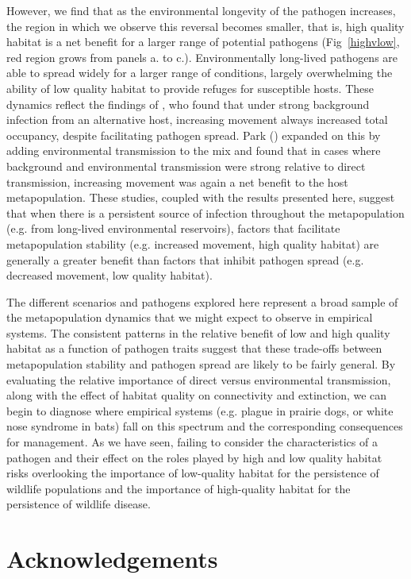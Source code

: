 \documentclass{article}
\begin{document}
However, we find that as the environmental longevity of the pathogen increases, the region in which we observe this reversal becomes smaller, that is, high quality habitat is a net benefit for a larger range of potential pathogens (Fig~\ref{highvlow}, red region grows from panels a. to c.).
Environmentally long-lived pathogens are able to spread widely for a larger range of conditions, largely overwhelming the ability of low quality habitat to provide refuges for susceptible hosts. 
These dynamics reflect the findings of \cite{Gog2002}, who found that under strong background infection from an alternative host, increasing movement always increased total occupancy, despite facilitating pathogen spread.  
Park (\cite{Park2012}) expanded on this by adding environmental transmission to the mix and found that in cases where background and environmental transmission were strong relative to direct transmission, increasing movement was again a net benefit to the host metapopulation.  
These studies, coupled with the results presented here, suggest that when there is a persistent source of infection throughout the metapopulation (e.g. from long-lived environmental reservoirs), factors that facilitate metapopulation stability (e.g. increased movement, high quality habitat) are generally a greater benefit than factors that inhibit pathogen spread (e.g. decreased movement, low quality habitat). 

The different scenarios and pathogens explored here represent a broad sample of the metapopulation dynamics that we might expect to observe in empirical systems.
The consistent patterns in the relative benefit of low and high quality habitat as a function of pathogen traits suggest that these trade-offs between metapopulation stability and pathogen spread are likely to be fairly general.  
By evaluating the relative importance of direct versus environmental transmission, along with the effect of habitat quality on connectivity and extinction, we can begin to diagnose where empirical systems (e.g. plague in prairie dogs, or white nose syndrome in bats) fall on this spectrum and the corresponding consequences for management.
As we have seen, failing to consider the characteristics of a pathogen and their effect on the roles played by high and low quality habitat risks overlooking the importance of low-quality habitat for the persistence of wildlife populations and the importance of high-quality habitat for the persistence of wildlife disease.

\section{Acknowledgements}
\end{document}
